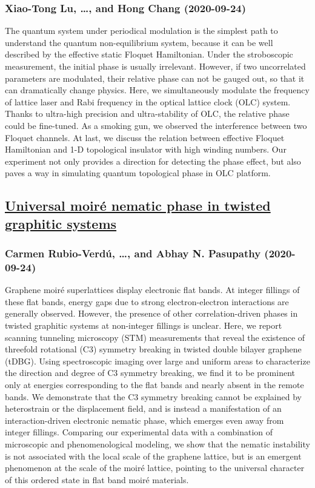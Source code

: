 \subsubsection*{Xiao-Tong Lu, \dots, and Hong Chang (2020-09-24)}
The quantum system under periodical modulation is the simplest path to
understand the quantum non-equilibrium system, because it can be well described
by the effective static Floquet Hamiltonian. Under the stroboscopic
measurement, the initial phase is usually irrelevant. However, if two
uncorrelated parameters are modulated, their relative phase can not be gauged
out, so that it can dramatically change physics. Here, we simultaneously
modulate the frequency of lattice laser and Rabi frequency in the optical
lattice clock (OLC) system. Thanks to ultra-high precision and ultra-stability
of OLC, the relative phase could be fine-tuned. As a smoking gun, we observed
the interference between two Floquet channels. At last, we discuss the relation
between effective Floquet Hamiltonian and 1-D topological insulator with high
winding numbers. Our experiment not only provides a direction for detecting the
phase effect, but also paves a way in simulating quantum topological phase in
OLC platform.

\subsection*{\href{http://arxiv.org/abs/2009.11645v1}{Universal moiré nematic phase in twisted graphitic systems}}
\subsubsection*{Carmen Rubio-Verdú, \dots, and Abhay N. Pasupathy (2020-09-24)}
Graphene moir\'e superlattices display electronic flat bands. At integer
fillings of these flat bands, energy gaps due to strong electron-electron
interactions are generally observed. However, the presence of other
correlation-driven phases in twisted graphitic systems at non-integer fillings
is unclear. Here, we report scanning tunneling microscopy (STM) measurements
that reveal the existence of threefold rotational (C3) symmetry breaking in
twisted double bilayer graphene (tDBG). Using spectroscopic imaging over large
and uniform areas to characterize the direction and degree of C3 symmetry
breaking, we find it to be prominent only at energies corresponding to the flat
bands and nearly absent in the remote bands. We demonstrate that the C3
symmetry breaking cannot be explained by heterostrain or the displacement
field, and is instead a manifestation of an interaction-driven electronic
nematic phase, which emerges even away from integer fillings. Comparing our
experimental data with a combination of microscopic and phenomenological
modeling, we show that the nematic instability is not associated with the local
scale of the graphene lattice, but is an emergent phenomenon at the scale of
the moir\'e lattice, pointing to the universal character of this ordered state
in flat band moir\'e materials.

